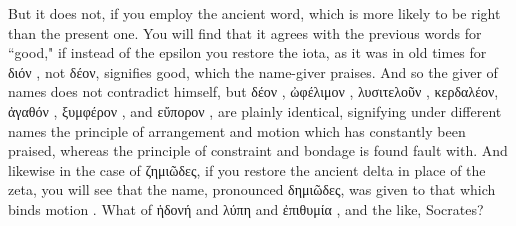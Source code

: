 {{{{{But it does not, if you employ the ancient word,  which is more likely to be right than the present one. You will find that it agrees with the previous words for ``good," if instead of the epsilon you restore the iota, as it was in old times for διόν , not δέον, signifies good, which the name-giver praises. And so the giver of names does not contradict himself, but δέον , ὠφέλιμον , λυσιτελοῦν , κερδαλέον, ἀγαθόν , ξυμφέρον , and εὔπορον , are plainly identical, signifying under different names the principle of arrangement and motion which has constantly been praised,  whereas the principle of constraint and bondage is found fault with. And likewise in the case of ζημιῶδες, if you restore the ancient delta in place of the zeta, you will see that the name, pronounced δημιῶδες, was given to that which binds motion .
\hermogenesspeaks
What of ἡδονή  and λύπη  and ἐπιθυμία , and the like, Socrates?
\socratesspeaks
}}}}}
